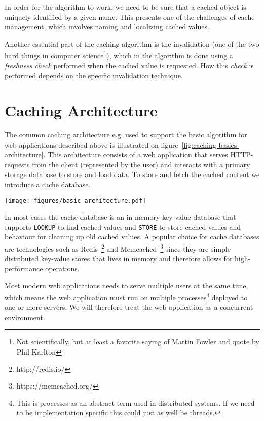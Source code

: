 In order for the algorithm to work, we need to be sure that a cached object is uniquely identified by a given name. This presents one of the challenges of cache management, which involves naming and localizing cached values.

Another essential part of the caching algorithm is the invalidation (one of the two hard things in computer science\footnote{Not scientifically, but at least a favorite saying of Martin Fowler and quote by Phil Karlton}), which in the algorithm is done using a \emph{freshness check} performed when the cached value is requested. How this \emph{check} is performed depends on the specific invalidation technique.

\section{Caching Architecture}
\label{subsec:architecture}

The common caching architecture e.g. used to support the basic algorithm for web applications described above is illustrated on figure~\ref{fig:caching-basics-architecture}. This architecture consists of a web application that serves HTTP-requests from the client (represented by the user) and interacts with a primary storage database to store and load data. To store and fetch the cached content we introduce a cache database.

\begin{figure*}[ht!]
  \centering
  \texttt{[image: figures/basic-architecture.pdf]}
  \caption{The assumed architecture of the system}
  \label{fig:caching-basics-architecture}
\end{figure*}

In most cases the cache database is an in-memory key-value database that supports \verb$LOOKUP$ to find cached values and \verb$STORE$ to store cached values and behaviour for cleaning up old cached values. A popular choice for cache databases are technologies such as Redis~\footnote{http://redis.io/} and Memcached~\footnote{https://memcached.org/} since they are simple distributed key-value stores that lives in memory and therefore allows for high-performance operations.

Most modern web applications needs to serve multiple users at the same time, which means the web application must run on multiple processes\footnote{This is processes as an abstract term used in distributed systems. If we need to be implementation specific this could just as well be threads.} deployed to one or more servers. We will therefore treat the web application as a concurrent environment.

